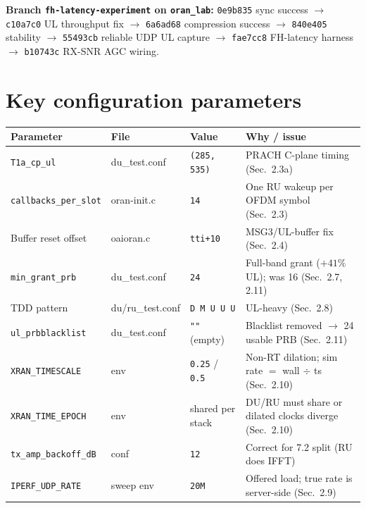 \documentclass[11pt,a4paper]{article}
\begin{document}
\textbf{Branch \texttt{fh-latency-experiment} on \texttt{oran\_lab}:}
\texttt{0e9b835} sync success $\rightarrow$
\texttt{c10a7c0} UL throughput fix $\rightarrow$
\texttt{6a6ad68} compression success $\rightarrow$
\texttt{840e405} stability $\rightarrow$
\texttt{55493cb} reliable UDP UL capture $\rightarrow$
\texttt{fae7cc8} FH-latency harness $\rightarrow$
\texttt{b10743c} RX-SNR AGC wiring.

\section{Key configuration parameters}

\begin{table}[h]\centering\small
\begin{tabularx}{\linewidth}{@{}l l l X@{}}
\toprule
\textbf{Parameter} & \textbf{File} & \textbf{Value} & \textbf{Why / issue} \\
\midrule
\texttt{T1a\_cp\_ul}          & du\_test.conf    & \texttt{(285, 535)}          & PRACH C-plane timing (Sec.~2.3a) \\
\texttt{callbacks\_per\_slot} & oran-init.c      & \texttt{14}                  & One RU wakeup per OFDM symbol (Sec.~2.3) \\
Buffer reset offset           & oaioran.c        & \texttt{tti+10}              & MSG3/UL-buffer fix (Sec.~2.4) \\
\texttt{min\_grant\_prb}      & du\_test.conf    & \texttt{24}                  & Full-band grant ($+41\%$ UL); was 16 (Sec.~2.7, 2.11) \\
TDD pattern                   & du/ru\_test.conf & \texttt{D M U U U}           & UL-heavy (Sec.~2.8) \\
\texttt{ul\_prbblacklist}     & du\_test.conf    & \texttt{""} (empty)          & Blacklist removed $\rightarrow$ 24 usable PRB (Sec.~2.11) \\
\texttt{XRAN\_TIMESCALE}      & env              & \texttt{0.25} / \texttt{0.5} & Non-RT dilation; sim rate $=$ wall $\div$ ts (Sec.~2.10) \\
\texttt{XRAN\_TIME\_EPOCH}    & env              & shared per stack             & DU/RU must share or dilated clocks diverge (Sec.~2.10) \\
\texttt{tx\_amp\_backoff\_dB} & conf             & \texttt{12}                  & Correct for 7.2 split (RU does IFFT) \\
\texttt{IPERF\_UDP\_RATE}     & sweep env        & \texttt{20M}                 & Offered load; true rate is server-side (Sec.~2.9) \\
\bottomrule
\end{tabularx}
\end{table}
\end{document}
